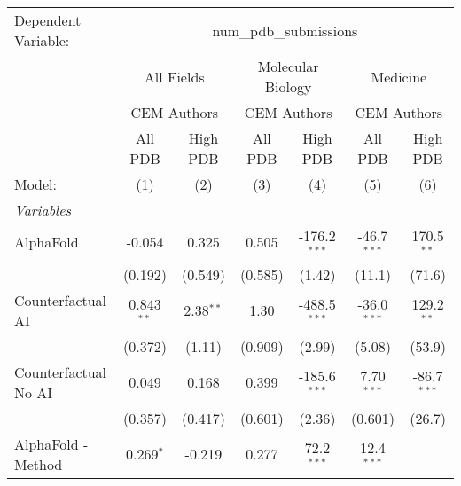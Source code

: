 \begingroup
\centering
\begin{tabular}{lcccccc}
   \tabularnewline \midrule \midrule
   Dependent Variable: & \multicolumn{6}{c}{num\_pdb\_submissions}\\
 & \multicolumn{2}{c}{All Fields} & \multicolumn{2}{c}{Molecular Biology} & \multicolumn{2}{c}{Medicine} \\
\cmidrule(lr){2-3} \cmidrule(lr){4-5} \cmidrule(lr){6-7}
 & \multicolumn{2}{c}{CEM Authors} & \multicolumn{2}{c}{CEM Authors} & \multicolumn{2}{c}{CEM Authors} \\
\cmidrule(lr){2-3} \cmidrule(lr){4-5} \cmidrule(lr){6-7}
 & \multicolumn{1}{c}{All PDB} & \multicolumn{1}{c}{High PDB} & \multicolumn{1}{c}{All PDB} & \multicolumn{1}{c}{High PDB} & \multicolumn{1}{c}{All PDB} & \multicolumn{1}{c}{High PDB} \\
\cmidrule(lr){2-2} \cmidrule(lr){3-3} \cmidrule(lr){4-4} \cmidrule(lr){5-5} \cmidrule(lr){6-6} \cmidrule(lr){7-7}
   Model:                                                     & (1)           & (2)           & (3)          & (4)            & (5)           & (6)\\  
   \midrule
   \emph{Variables}\\
   AlphaFold                                                  & -0.054        & 0.325         & 0.505        & -176.2$^{***}$ & -46.7$^{***}$ & 170.5$^{**}$\\   
                                                              & (0.192)       & (0.549)       & (0.585)      & (1.42)         & (11.1)        & (71.6)\\   
   Counterfactual AI                                          & 0.843$^{**}$  & 2.38$^{**}$   & 1.30         & -488.5$^{***}$ & -36.0$^{***}$ & 129.2$^{**}$\\   
                                                              & (0.372)       & (1.11)        & (0.909)      & (2.99)         & (5.08)        & (53.9)\\   
   Counterfactual No AI                                       & 0.049         & 0.168         & 0.399        & -185.6$^{***}$ & 7.70$^{***}$  & -86.7$^{***}$\\   
                                                              & (0.357)       & (0.417)       & (0.601)      & (2.36)         & (0.601)       & (26.7)\\   
   AlphaFold - Method                                         & 0.269$^{*}$   & -0.219        & 0.277        & 72.2$^{***}$   & 12.4$^{***}$  &   \\   

\end{tabular}
